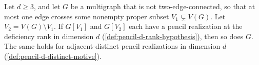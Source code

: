 \begin{lemma}
  \label{lem:pencil-d-cut-case}
  \leanok
  Let $d \ge 3$, and let $G$ be a multigraph that is not
  two-edge-connected, so that at most one edge crosses some nonempty
  proper subset $V_1 \subsetneq V(G)$. Let $V_2 = V(G) \setminus V_1$. If
  $G[V_1]$ and $G[V_2]$ each have a pencil realization at the deficiency
  rank in dimension $d$ (\cref{def:pencil-d-rank-hypothesis}), then so
  does $G$. The same holds for adjacent-distinct pencil realizations in
  dimension $d$ (\cref{def:pencil-d-distinct-motive}).
\end{lemma}
